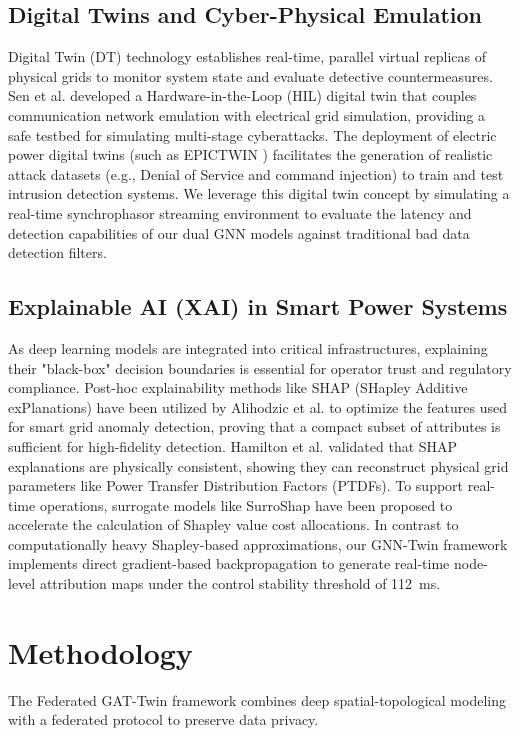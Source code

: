 \documentclass[conference]{IEEEtran}
\begin{document}
\subsection{Digital Twins and Cyber-Physical Emulation}
Digital Twin (DT) technology establishes real-time, parallel virtual replicas of physical grids to monitor system state and evaluate detective countermeasures. Sen et al. \cite{sen_dt_countermeasures} developed a Hardware-in-the-Loop (HIL) digital twin that couples communication network emulation with electrical grid simulation, providing a safe testbed for simulating multi-stage cyberattacks. The deployment of electric power digital twins (such as EPICTWIN \cite{sen_epictwin}) facilitates the generation of realistic attack datasets (e.g., Denial of Service and command injection) to train and test intrusion detection systems. We leverage this digital twin concept by simulating a real-time synchrophasor streaming environment to evaluate the latency and detection capabilities of our dual GNN models against traditional bad data detection filters.

\subsection{Explainable AI (XAI) in Smart Power Systems}
As deep learning models are integrated into critical infrastructures, explaining their "black-box" decision boundaries is essential for operator trust and regulatory compliance. Post-hoc explainability methods like SHAP (SHapley Additive exPlanations) have been utilized by Alihodzic et al. \cite{alihodzic_shap} to optimize the features used for smart grid anomaly detection, proving that a compact subset of attributes is sufficient for high-fidelity detection. Hamilton et al. \cite{hamilton_shap} validated that SHAP explanations are physically consistent, showing they can reconstruct physical grid parameters like Power Transfer Distribution Factors (PTDFs). To support real-time operations, surrogate models like SurroShap \cite{feng_surroshap} have been proposed to accelerate the calculation of Shapley value cost allocations. In contrast to computationally heavy Shapley-based approximations, our GNN-Twin framework implements direct gradient-based backpropagation to generate real-time node-level attribution maps under the control stability threshold of 112~ms.

\section{Methodology}\label{sec:methodology}
The Federated GAT-Twin framework combines deep spatial-topological modeling with a federated protocol to preserve data privacy.
\end{document}

